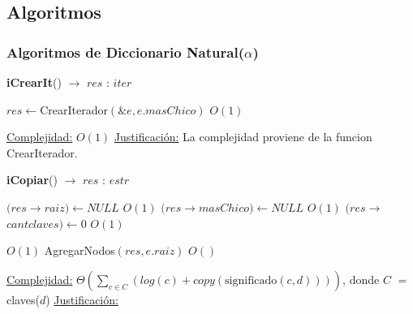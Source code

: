 
\subsection{Algoritmos}

\subsubsection{Algoritmos de Diccionario Natural($\alpha$)}


\begin{algorithm}[H]{\textbf{iCrearIt}() $\to$ $res$ : $iter$}
	\begin{algorithmic}

		\State $res \gets $CrearIterador$(\&e, e.masChico)$ \Comment $O(1)$


		\medskip
		\Statex \underline{Complejidad:} $O(1)$
		\Statex \underline{Justificación:} La complejidad proviene de la funcion CrearIterador.

    \end{algorithmic}
\end{algorithm}


\begin{algorithm}[H]{\textbf{iCopiar}() $\to$ $res$ : $estr$}
	\begin{algorithmic}

		\State $(res$$\rightarrow$$raiz) \gets NULL$ \Comment $O(1)$
		\State $(res$$\rightarrow$$masChico) \gets NULL$ \Comment $O(1)$
		\State $(res$$\rightarrow$$cantclaves) \gets 0$ \Comment $O(1)$

		 \Comment $O(1)$
			\State AgregarNodos$(res, e.raiz)$ \Comment $O()$
		\EndIf


		\medskip
		\Statex \underline{Complejidad:} $\displaystyle\Theta\left(\sum_{c \in C}\left(log(c) + copy(\text{significado}(c,d))\right)\right)$, donde $C$ $=$ claves($d$)
		\Statex \underline{Justificación:} 

    \end{algorithmic}
\end{algorithm}



